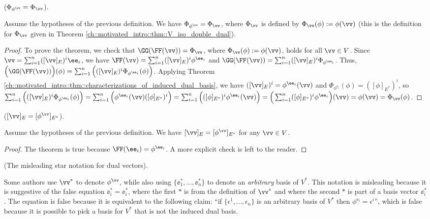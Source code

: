 \begin{theorem}
    \label{ch::motivated_intro::thm::Phiphiv_eq_Phiv}
    ($\Phi_{\phi^\vv} = \Phi_\vv$).

    Assume the hypotheses of the previous definition. We have $\Phi_{\phi^\vv} = \Phi_\vv$, where $\Phi_\vv$ is defined by $\Phi_\vv(\phi) := \phi(\vv)$ (this is the definition for $\Phi_\vv$ given in Theorem \ref{ch::motivated_intro::thm::V_iso_double_dual}).
\end{theorem}

\begin{proof}
    To prove the theorem, we check that $\GG(\FF(\vv)) = \Phi_\vv$, where $\Phi_\vv(\phi) := \phi(\vv)$, holds for all $\vv \in V$. Since $\vv = \sum_{i = 1}^n ([\vv]_E)^i \ee_i$, we have $\FF(\vv) = \sum_{i = 1}^n ([\vv]_E)^i \phi^{\ee_i}$ and $\GG(\FF(\vv)) = \sum_{i = 1}^n ([\vv]_E)^i \Phi_{\phi^{\ee_i}}$. Thus, $\Big(\GG(\FF(\vv))\Big)(\phi) = \sum_{i = 1}^n \Big( ([\vv]_E)^i \Phi_{\phi^{\ee_i}}(\phi) \Big)$. Applying Theorem \ref{ch::motivated_intro::thm::characterizations_of_induced_dual_basis}, we have $([\vv]_E)^i = \phi^{\ee_i}(\vv)$ and $\Phi_{\phi^{\ee_i}}(\phi) = ([\phi]_{E^*})^i$, so \\ ${\sum_{i = 1}^n \Big( ([\vv]_E)^i \Phi_{\phi^{\ee_i}}(\phi) \Big) = \sum_{i = 1}^n \Big( \phi^{\ee_i}(\vv) ([\phi]_{E^*})^i \Big) = \sum_{i = 1}^n \Big( ([\phi]_{E^*})^i \phi^{\ee_i}(\vv) \Big) = \Big(\sum_{i = 1}^n ([\phi]_{E^*})^i \phi^{\ee_i}\Big)(\vv) = \phi(\vv) = \Phi_\vv(\phi)}$.
\end{proof}

\begin{theorem}
    \label{ch::bilinear_forms_metric_tensors::thm:vv_E_eq_phi_vv_Estar}
    
    ($[\vv]_E = [\phi^\vv]_{E^*}$).
    
    Assume the hypotheses of the previous definition. We have $[\vv]_E = [\phi^\vv]_{E^*}$ for any $\vv \in V$.
\end{theorem}

\begin{proof}
    The theorem is true because $\FF(\ee_i) = \phi^{\ee_i}$. A more explicit check is left to the reader.
\end{proof}

\begin{remark}
    (The misleading star notation for dual vectors).
    
    Some authors use $\vv^*$ to denote $\phi^\vv$, while also using $\{\ee_1^*, ..., \ee_n^*\}$ to denote an \textit{arbitrary} basis of $V^*$. This notation is misleading because it is suggestive of the false equation $\ee_i^* = \ee_i^*$, where the first $*$ is from the definition of $\vv^*$ and where the second $*$ is part of a basis vector $\ee_i^*$. The equation is false because it is equivalent to the following claim: ``if $\{\epsilon^1, ..., \epsilon_n\}$ is an arbitrary basis of $V^*$ then $\phi^{\ee_i} = \epsilon^i$'', which is false because it is possible to pick a basis for $V^*$ that is not the induced dual basis.
\end{remark}

